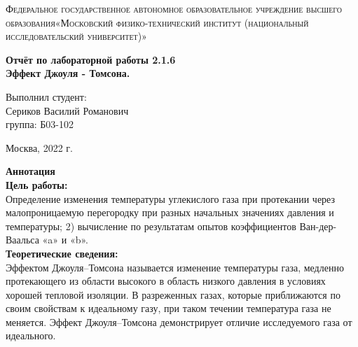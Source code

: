 \documentclass[a4paper, 12pt]{article}%
\begin{document}
	\begin{titlepage}
		\begin{center}
			\textsc{Федеральное государственное автономное образовательное учреждение высшего образования«Московский физико-технический институт (национальный исследовательский университет)»\\[5mm]
			}
			
			\vfill
			
			\textbf{Отчёт по лабораторной работы 2.1.6\\[3mm]
				Эффект Джоуля - Томсона.
				\\[50mm]
			}
			
		\end{center}
		
		\hfill
		\begin{minipage}{.5\textwidth}
			Выполнил студент:\\[2mm]
			Сериков Василий Романович\\[2mm]
			группа: Б03-102\\[5mm]
			
		\end{minipage}
		\vfill
		\begin{center}
			Москва, 2022 г.
		\end{center}
		
	\end{titlepage}
	
	\newpage
	\textbf{Аннотация}\\
	
	
	\textbf{Цель работы: }\\
	
	Определение изменения температуры углекислого газа при протекании через малопроницаемую перегородку при разных начальных значениях давления и температуры; 2) вычисление по результатам опытов коэффициентов Ван-дер-Ваальса «a» и «b».\\
	
	
	\textbf{Теоретические сведения: } \\
	
	Эффектом Джоуля–Томсона называется изменение температуры газа, медленно протекающего из области высокого в область низкого давления в условиях хорошей тепловой изоляции. В разреженных газах, которые приближаются по своим свойствам к идеальному газу, при таком течении температура газа не меняется. Эффект Джоуля–Томсона демонстрирует отличие исследуемого газа от идеального.\\
	
\end{document}

